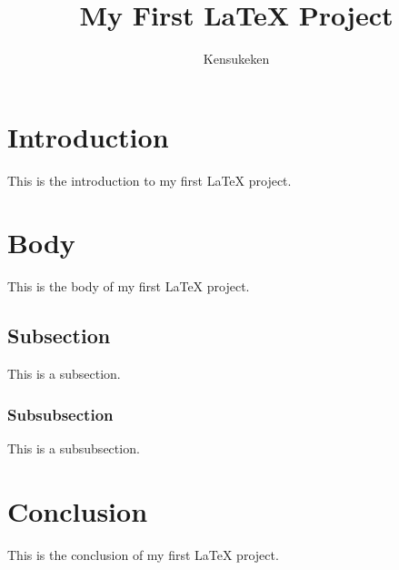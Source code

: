 \documentclass{article} %
\begin{document}

\title{My First LaTeX Project} %
\author{Kensukeken} %

\maketitle %

\section{Introduction} %

This is the introduction to my first LaTeX project. %

\section{Body} %

This is the body of my first LaTeX project. %

\subsection{Subsection} %

This is a subsection. %

\subsubsection{Subsubsection} %

This is a subsubsection. %

\section{Conclusion} %

This is the conclusion of my first LaTeX project. %
\end{document}
